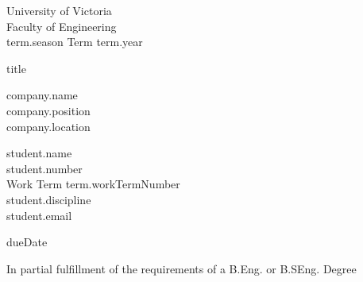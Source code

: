 \begin{center}
  University of Victoria \\
  Faculty of Engineering \\
  {{term.season}} Term {{term.year}} \\ %
  \vspace{1cm}

  {\huge {{title}}}\\
  \vspace{1cm}

  {{company.name}} \\
  {{company.position}} \\
  {{company.location}} \\      %
  \vspace{1cm}

  {{student.name}} \\
  {{student.number}} \\
  Work Term {{term.workTermNumber}} \\                %
  {{student.discipline}} \\
  {{student.email}} \\
  \vspace{1cm}

  {{dueDate}} \\              %
  \vspace{1cm}

  In partial fulfillment of the requirements of a B.Eng. or B.SEng. Degree \\
  \vfill


\end{center}

